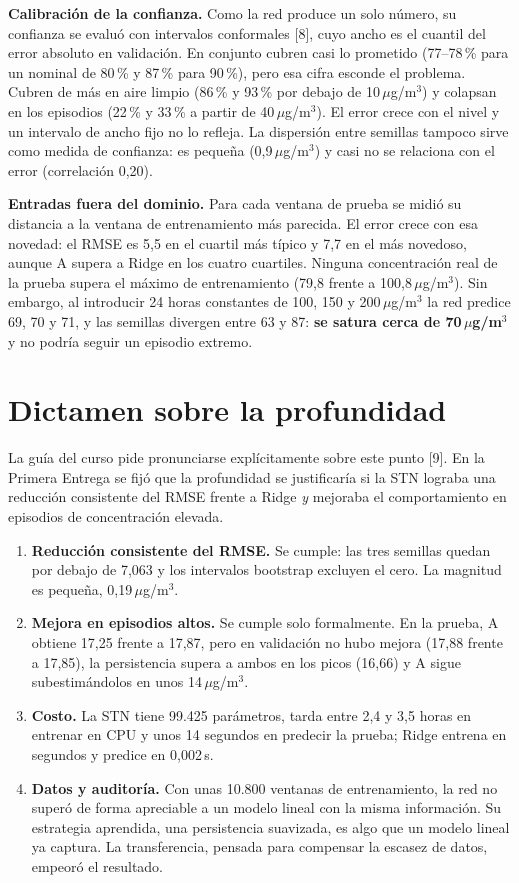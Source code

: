 \documentclass[11pt,letterpaper]{article}
\newcommand{\ugm}{\,$\mu$g/m$^3$}
\begin{document}
\textbf{Calibración de la confianza.} Como la red produce un solo número, su confianza se evaluó con
intervalos conformales [8], cuyo ancho es el cuantil del error absoluto en validación. En conjunto cubren
casi lo prometido (77–78\,\% para un nominal de 80\,\% y 87\,\% para 90\,\%), pero esa cifra esconde el
problema. Cubren de más en aire limpio (86\,\% y 93\,\% por debajo de 10\ugm) y colapsan en los episodios
(22\,\% y 33\,\% a partir de 40\ugm). El error crece con el nivel y un intervalo de ancho fijo no lo
refleja. La dispersión entre semillas tampoco sirve como medida de confianza: es pequeña (0,9\ugm) y casi
no se relaciona con el error (correlación 0,20).

\textbf{Entradas fuera del dominio.} Para cada ventana de prueba se midió su distancia a la ventana de
entrenamiento más parecida. El error crece con esa novedad: el RMSE es 5,5 en el cuartil más típico y 7,7
en el más novedoso, aunque A supera a Ridge en los cuatro cuartiles. Ninguna concentración real de la
prueba supera el máximo de entrenamiento (79,8 frente a 100,8\ugm). Sin embargo, al introducir 24 horas
constantes de 100, 150 y 200\ugm{} la red predice 69, 70 y 71, y las semillas divergen entre 63 y 87:
\textbf{se satura cerca de 70\ugm} y no podría seguir un episodio extremo.

\section{Dictamen sobre la profundidad}

La guía del curso pide pronunciarse explícitamente sobre este punto [9]. En la Primera Entrega se fijó que la profundidad se justificaría si la STN lograba una reducción
consistente del RMSE frente a Ridge \emph{y} mejoraba el comportamiento en episodios de concentración
elevada.

\begin{enumerate}
\item \textbf{Reducción consistente del RMSE.} Se cumple: las tres semillas quedan por debajo de 7,063 y los
  intervalos bootstrap excluyen el cero. La magnitud es pequeña, 0,19\ugm.
\item \textbf{Mejora en episodios altos.} Se cumple solo formalmente. En la prueba, A obtiene 17,25 frente
  a 17,87, pero en validación no hubo mejora (17,88 frente a 17,85), la persistencia supera a ambos en los
  picos (16,66) y A sigue subestimándolos en unos 14\ugm.
\item \textbf{Costo.} La STN tiene 99.425 parámetros, tarda entre 2,4 y 3,5 horas en entrenar en CPU y unos
  14 segundos en predecir la prueba; Ridge entrena en segundos y predice en 0,002\,s.
\item \textbf{Datos y auditoría.} Con unas 10.800 ventanas de entrenamiento, la red no superó de forma
  apreciable a un modelo lineal con la misma información. Su estrategia aprendida, una persistencia
  suavizada, es algo que un modelo lineal ya captura. La transferencia, pensada para compensar la escasez
  de datos, empeoró el resultado.
\end{enumerate}
\end{document}
